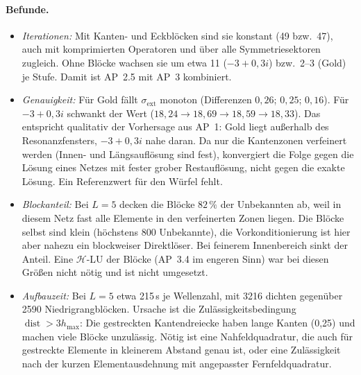 \documentclass[11pt, a4paper]{article}
\begin{document}
\paragraph{Befunde.}
\begin{itemize}[leftmargin=*]
  \item \emph{Iterationen:} Mit Kanten- und Eckblöcken sind sie konstant (49 bzw.\ 47), auch
    mit komprimierten Operatoren und über alle Symmetriesektoren zugleich. Ohne Blöcke
    wachsen sie um etwa 11 ($-3+0{,}3i$) bzw.\ 2--3 (Gold) je Stufe. Damit ist AP~2.5 mit AP~3
    kombiniert.
  \item \emph{Genauigkeit:} Für Gold fällt $\sigma_{\mathrm{ext}}$ monoton (Differenzen
    $0{,}26$; $0{,}25$; $0{,}16$). Für $-3+0{,}3i$ schwankt der Wert
    ($18{,}24\to18{,}69\to18{,}59\to18{,}33$). Das entspricht qualitativ der Vorhersage aus
    AP~1: Gold liegt außerhalb des Resonanzfensters, $-3+0{,}3i$ nahe daran. Da nur die
    Kantenzonen verfeinert werden (Innen- und Längsauflösung sind fest), konvergiert die
    Folge gegen die Lösung eines Netzes mit fester grober Restauflösung, nicht gegen die
    exakte Lösung. Ein Referenzwert für den Würfel fehlt.
  \item \emph{Blockanteil:} Bei $L=5$ decken die Blöcke $82\,\%$ der Unbekannten ab, weil in
    diesem Netz fast alle Elemente in den verfeinerten Zonen liegen. Die Blöcke selbst sind
    klein (höchstens 800 Unbekannte), die Vorkonditionierung ist hier aber nahezu ein
    blockweiser Direktlöser. Bei feinerem Innenbereich sinkt der Anteil. Eine
    $\mathcal{H}$-LU der Blöcke (AP~3.4 im engeren Sinn) war bei diesen Größen nicht nötig
    und ist nicht umgesetzt.
  \item \emph{Aufbauzeit:} Bei $L=5$ etwa 215\,s je Wellenzahl, mit 3216 dichten gegenüber
    2590 Niedrigrangblöcken. Ursache ist die Zulässigkeitsbedingung
    $\operatorname{dist}>3h_{\max}$: Die gestreckten Kantendreiecke haben lange Kanten (0,25)
    und machen viele Blöcke unzulässig. Nötig ist eine Nahfeldquadratur, die auch für
    gestreckte Elemente in kleinerem Abstand genau ist, oder eine Zulässigkeit nach der
    kurzen Elementausdehnung mit angepasster Fernfeldquadratur.
\end{itemize}
\end{document}

